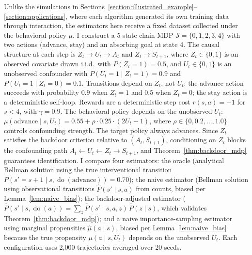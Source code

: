 Unlike the simulations in Sections~\ref{section:illustrated_example}--\ref{section:applications}, where each algorithm generated its own training data through interaction, the estimators here receive a fixed dataset collected under the behavioral policy $\mu$. I construct a 5-state chain MDP $\mathcal{S} = \{0,1,2,3,4\}$ with two actions (advance, stay) and an absorbing goal at state 4. The causal structure at each step is $Z_t \to U_t \to A_t$ and $Z_t \to S_{t+1}$, where $Z_t \in \{0,1\}$ is an observed covariate drawn i.i.d.\ with $P(Z_t{=}1) = 0.5$, and $U_t \in \{0,1\}$ is an unobserved confounder with $P(U_t{=}1 \mid Z_t{=}1) = 0.9$ and $P(U_t{=}1 \mid Z_t{=}0) = 0.1$. Transitions depend on $Z_t$, not $U_t$: the advance action succeeds with probability $0.9$ when $Z_t = 1$ and $0.5$ when $Z_t = 0$; the stay action is a deterministic self-loop. Rewards are a deterministic step cost $r(s,a) = -1$ for $s < 4$, with $\gamma = 0.9$. The behavioral policy depends on the unobserved $U_t$: $\mu(\text{advance} \mid s, U_t) = 0.55 + \rho \cdot 0.25 \cdot (2U_t - 1)$, where $\rho \in \{0, 0.2, \ldots, 1.0\}$ controls confounding strength. The target policy always advances. Since $Z_t$ satisfies the backdoor criterion relative to $(A_t, S_{t+1})$, conditioning on $Z_t$ blocks the confounding path $A_t \leftarrow U_t \leftarrow Z_t \rightarrow S_{t+1}$, and Theorem~\ref{thm:backdoor_mdp} guarantees identification. I compare four estimators: the oracle (analytical Bellman solution using the true interventional transition $P(s'{=}s{+}1 \mid s, \operatorname{do}(\text{advance})) = 0.70$); the naive estimator (Bellman solution using observational transitions $\hat{P}(s' \mid s, a)$ from counts, biased per Lemma~\ref{lem:naive_bias}); the backdoor-adjusted estimator ($\hat{P}(s' \mid s, \operatorname{do}(a)) = \sum_z \hat{P}(s' \mid s, a, z)\,\hat{P}(z \mid s)$, which validates Theorem~\ref{thm:backdoor_mdp}); and a naive importance-sampling estimator using marginal propensities $\hat{\mu}(a \mid s)$, biased per Lemma~\ref{lem:naive_bias} because the true propensity $\mu(a \mid s, U_t)$ depends on the unobserved $U_t$. Each configuration uses 2{,}000 trajectories averaged over 20 seeds.

